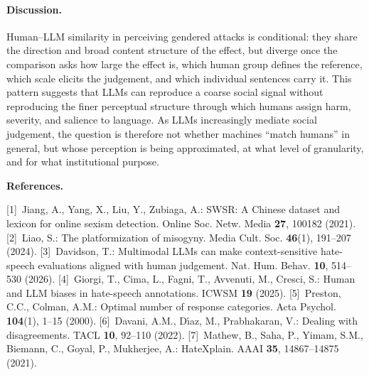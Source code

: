 \documentclass[runningheads]{llncs}
\begin{document}
\enlargethispage{8\baselineskip}

\paragraph{Discussion.}
Human--LLM similarity in perceiving gendered attacks is conditional: they share the direction and broad content structure of the effect, but diverge once the comparison asks how large the effect is, which human group defines the reference, which scale elicits the judgement, and which individual sentences carry it. This pattern suggests that LLMs can reproduce a coarse social signal without reproducing the finer perceptual structure through which humans assign harm, severity, and salience to language. As LLMs increasingly mediate social judgement, the question is therefore not whether machines ``match humans'' in general, but whose perception is being approximated, at what level of granularity, and for what institutional purpose.

\vspace{0.3ex}
\noindent\textbf{References.}
{\scriptsize
[1]~Jiang, A., Yang, X., Liu, Y., Zubiaga, A.: SWSR: A Chinese dataset and lexicon for online sexism detection. Online Soc. Netw. Media \textbf{27}, 100182 (2021).
[2]~Liao, S.: The platformization of misogyny. Media Cult. Soc. \textbf{46}(1), 191--207 (2024).
[3]~Davidson, T.: Multimodal LLMs can make context-sensitive hate-speech evaluations aligned with human judgement. Nat. Hum. Behav. \textbf{10}, 514--530 (2026).
[4]~Giorgi, T., Cima, L., Fagni, T., Avvenuti, M., Cresci, S.: Human and LLM biases in hate-speech annotations. ICWSM \textbf{19} (2025).
[5]~Preston, C.C., Colman, A.M.: Optimal number of response categories. Acta Psychol. \textbf{104}(1), 1--15 (2000).
[6]~Davani, A.M., D\'{\i}az, M., Prabhakaran, V.: Dealing with disagreements. TACL \textbf{10}, 92--110 (2022).
[7]~Mathew, B., Saha, P., Yimam, S.M., Biemann, C., Goyal, P., Mukherjee, A.: HateXplain. AAAI \textbf{35}, 14867--14875 (2021).
\par}
\end{document}
